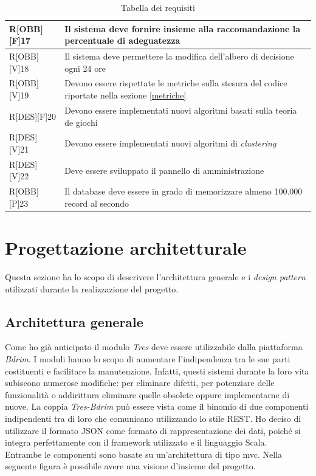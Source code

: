 \newpage
\begin{table}[h]
	\begin{tabular}{|p{}|p{}|}
		\midrule
		
		R[OBB][F]17 & Il sistema deve fornire insieme alla raccomandazione la percentuale di adeguatezza \\ \midrule
		R[OBB][V]18 & Il sistema deve permettere la modifica dell'albero di decisione ogni 24 ore \\ \midrule
		R[OBB][V]19 & Devono essere rispettate le metriche sulla stesura del codice riportate nella sezione \ref{metriche} \\ \midrule
		R[DES][F]20 & Devono essere implementati nuovi algoritmi basati sulla teoria de giochi \\ \midrule
		R[DES][V]21 & Devono essere implementati nuovi algoritmi di \textit{clustering} \\ \midrule
		R[DES][V]22 & Deve essere sviluppato il pannello di amministrazione \\ \midrule
		R[OBB][P]23 & Il database deve essere in grado di memorizzare almeno 100.000 record al secondo \\ 
		
		\bottomrule
		
	\end{tabular}
	\caption{Tabella dei requisiti}
\end{table}

\section{Progettazione architetturale}
Questa sezione ha lo scopo di descrivere l'architettura generale e i \textit{design pattern} utilizzati durante la realizzazione del progetto.
\subsection{Architettura generale}
Come ho già anticipato il modulo \textit{Tres} deve essere utilizzabile dalla piattaforma \textit{Bdrim}.  I moduli hanno lo scopo di aumentare l'indipendenza tra le sue parti costituenti e facilitare la manutenzione. Infatti, questi sistemi durante la loro vita subiscono numerose modifiche: per eliminare difetti, per potenziare delle funzionalità o addirittura eliminare quelle obsolete oppure implementarne di nuove. La coppia \textit{Tres-Bdrim} può essere vista come il binomio di due componenti indipendenti tra di loro che comunicano utilizzando lo stile \gls{REST}. Ho deciso di utilizzare il formato \gls{JSON} come formato di rappresentazione dei dati, poiché si integra perfettamente con il \gls{framework} utilizzato e il linguaggio Scala.\\
Entrambe le componenti sono basate su un'architettura di tipo \gls{mvc}. Nella seguente figura è possibile avere una visione d'insieme del progetto.

